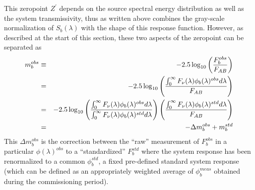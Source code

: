 \documentclass[12pt,preprint]{aastex}
\begin{document}
This zeropoint $Z^{'}$ depends on the source
spectral energy distribution as well as the system transmissivity, thus as written above
combines the gray-scale normalization of $S_b(\lambda)$ with the shape of this response function. 
However, as described at the start of this section, these two aspects of the 
zeropoint can be separated as 
\begin{eqnarray}
\label{eqn:stdmag}
     m_b^{obs} & \equiv & -2.5\log_{10}\left({F_b^{obs} \over F_{AB}}\right) \\
      & = &-2.5 \log_{10}\left( {\int_0^\infty {F_\nu(\lambda) \phi_b(\lambda)^{obs} d\lambda} \over F_{AB}} \right)  \\
       &= & -2.5 \log_{10} \left( {\int_0^\infty {F_\nu(\lambda) \phi_b(\lambda)^{obs} d\lambda} \over
        \int_0^\infty {F_\nu(\lambda) \phi_b(\lambda)^{std} d\lambda}} \right) 
         \left( \int_0^\infty {F_\nu(\lambda) \phi_b(\lambda)^{std} d\lambda} \over F_{AB}  \right) \\
         & = & -\Delta m_b^{obs} + m_b^{std} 
\end{eqnarray}
This $\Delta m_b^{obs}$ is the correction between the ``raw'' measurement of $F_b^{obs}$ 
in a particular $\phi(\lambda)^{obs}$ to a ``standardized'' $F_b^{std}$ where the system response
has been renormalized to a common $\phi_b^{std}$, a fixed pre-defined
standard system response (which can be defined as an 
appropriately weighted average of $\phi_b^{meas}$ obtained
during the commissioning period). 
\end{document}
